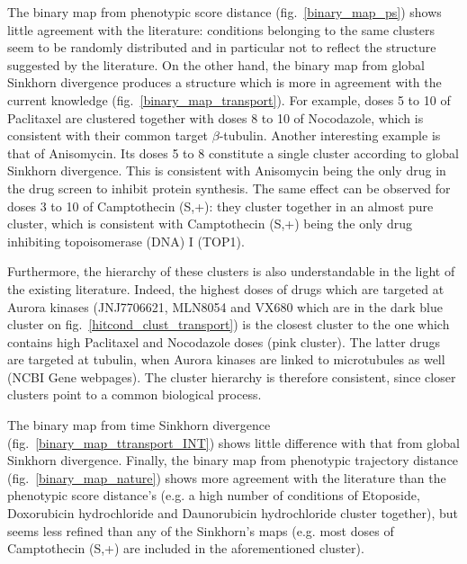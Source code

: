 The binary map from phenotypic score distance
(fig.~\ref{binary_map_ps}) shows little agreement with the literature:
conditions belonging to the same clusters seem to be randomly
distributed and in particular not to reflect the structure suggested
by the literature. 
On the other hand, the binary map from global Sinkhorn divergence produces a
structure which is more in agreement with the current knowledge
(fig.~\ref{binary_map_transport}). For example, doses 5 to 10 of
Paclitaxel are clustered together with doses 8 to 10 of Nocodazole,
which is consistent with their common target $\beta$-tubulin. 
Another interesting example is that of Anisomycin. Its doses 5 to 8 constitute a single cluster according to
global Sinkhorn divergence. This is consistent with Anisomycin being
the only drug in the drug screen to inhibit protein synthesis. The
same effect can be observed for doses 3 to 10 of Camptothecin (S,+):
they cluster together in an almost pure cluster, which is consistent
with Camptothecin (S,+) being the only drug inhibiting topoisomerase
(DNA) I (TOP1).  

Furthermore, the hierarchy of these clusters is also understandable in
the light of the existing literature. Indeed, the highest doses of
drugs which are targeted at Aurora kinases (JNJ7706621, MLN8054 and
VX680 which are in the dark blue cluster on
fig.~\ref{hitcond_clust_transport}) is the closest cluster to the one
which contains high Paclitaxel and Nocodazole doses (pink
cluster). The latter drugs are targeted at tubulin, when Aurora
kinases are linked to microtubules as well (NCBI Gene
webpages\cite{pmid24259432}). The cluster hierarchy is therefore consistent, since closer clusters point to a common biological process.

The binary map from time Sinkhorn divergence (fig.~\ref{binary_map_ttransport_INT}) shows little difference with that from global Sinkhorn divergence. Finally, the binary map from phenotypic trajectory distance (fig.~\ref{binary_map_nature}) shows more agreement with the literature than the phenotypic score distance's (e.g. a high number of conditions of Etoposide, Doxorubicin hydrochloride and Daunorubicin hydrochloride cluster together), but seems less refined than any of the Sinkhorn's maps (e.g. most doses of Camptothecin (S,+) are included in the aforementioned cluster). %

